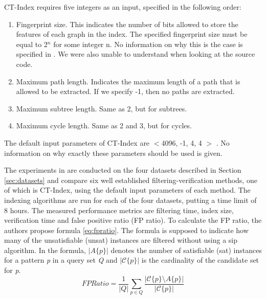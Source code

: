 \documentclass{l4proj}
\newcommand{\fancyC}{\mathcal{C}}
\begin{document}
CT-Index requires five integers as an input, specified in the following order:
\begin{enumerate}
\item Fingerprint size. This indicates the number of bits allowed to store the features of each graph in the index. The specified fingerprint size must be equal to 2$^{n}$ for some integer n. No information on why this is the case is specified in \cite{ctindex}. We were also unable to understand when looking at the source code.
\item Maximum path length. Indicates the maximum length of a path that is allowed to be extracted. If we specify -1, then no paths are extracted.
\item Maximum subtree length. Same as 2, but for subtrees.
\item Maximum cycle length. Same as 2 and 3, but for cycles.
\end{enumerate}

The default input parameters of CT-Index are $<$4096, -1, 4, 4 $>$ \cite{ctindex, foteini}. No information on why exactly these parameters should be used is given.

The experiments in \cite{foteini} are conducted on the four datasets described in Section \ref{sec:datasets} and compare six well established filtering-verification methods, one of which is CT-Index, using the default input parameters of each method. The indexing algorithms are run for each of the four datasets, putting a time limit of 8 hours. The measured performance metrics are filtering time, index size, verification time and false positive ratio (FP ratio). To calculate the FP ratio, the authors propose formula \ref{eq:fpratio}. The formula is supposed to indicate how many of the unsatisfiable (\gls{unsat}) instances are filtered without using a \gls{sip} algorithm. In the formula, \emph{$|A\{p\}|$} denotes the number of satisfiable (\gls{sat}) instances for a pattern \emph{p} in a query set \emph{Q} and \emph{$|\fancyC\{p\}|$} is the cardinality of the candidate set for \emph{p}.
\begin{equation}
\label{eq:fpratio}
FP Ratio = \frac{1}{|Q|} \sum_{p \in Q} \frac{|\fancyC\{p\} \setminus A\{p\}|}{|\fancyC\{p\}|}
\end{equation}
\end{document}
